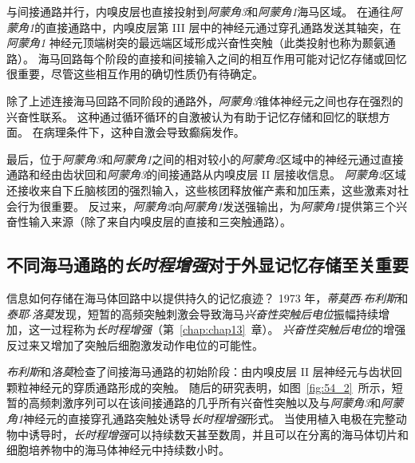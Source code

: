 与间接通路并行，内嗅皮层也直接投射到\textit{阿蒙角3}和\textit{阿蒙角1}海马区域。
在通往\textit{阿蒙角1}的直接通路中，内嗅皮层第 III 层中的神经元通过穿孔通路发送其轴突，在\textit{阿蒙角1} 神经元顶端树突的最远端区域形成兴奋性突触（此类投射也称为颞氨通路）。
海马回路每个阶段的直接和间接输入之间的相互作用可能对记忆存储或回忆很重要，尽管这些相互作用的确切性质仍有待确定。


除了上述连接海马回路不同阶段的通路外，\textit{阿蒙角3}锥体神经元之间也存在强烈的兴奋性联系。
这种通过循环循环的自激被认为有助于记忆存储和回忆的联想方面。
在病理条件下，这种自激会导致癫痫发作。


最后，位于\textit{阿蒙角3}和\textit{阿蒙角1}之间的相对较小的\textit{阿蒙角2}区域中的神经元通过直接通路和经由齿状回和\textit{阿蒙角3}的间接通路从内嗅皮层 II 层接收信息。
\textit{阿蒙角2}区域还接收来自下丘脑核团的强烈输入，这些核团释放催产素和加压素，这些激素对社会行为很重要。
反过来，\textit{阿蒙角2}向\textit{阿蒙角1}发送强输出，为\textit{阿蒙角1}提供第三个兴奋性输入来源（除了来自内嗅皮层的直接和三突触通路）。



\subsection{不同海马通路的\textit{长时程增强}对于外显记忆存储至关重要}

信息如何存储在海马体回路中以提供持久的记忆痕迹？
1973 年，\textit{蒂莫西$\cdot$布利斯}和\textit{泰耶$\cdot$洛莫}发现，短暂的高频突触刺激会导致海马\textit{兴奋性突触后电位}振幅持续增加，这一过程称为\textit{长时程增强}（第~\ref{chap:chap13}~章）。
\textit{兴奋性突触后电位}的增强反过来又增加了突触后细胞激发动作电位的可能性。


\textit{布利斯}和\textit{洛莫}检查了间接海马通路的初始阶段：由内嗅皮层 II 层神经元与齿状回颗粒神经元的穿质通路形成的突触。
随后的研究表明，如图~\ref{fig:54_2}~所示，短暂的高频刺激序列可以在该间接通路的几乎所有兴奋性突触以及与\textit{阿蒙角3}和\textit{阿蒙角1}神经元的直接穿孔通路突触处诱导\textit{长时程增强}形式。
当使用植入电极在完整动物中诱导时，\textit{长时程增强}可以持续数天甚至数周，并且可以在分离的海马体切片和细胞培养物中的海马体神经元中持续数小时。


